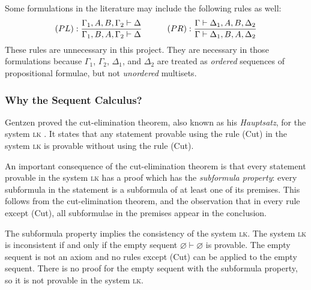 \begin{remark}
    Some formulations in the literature may include the following rules as well:
    {
        \derivationfont
        \[
            (PL): \frac{\Gamma_1, A, B, \Gamma_2 \vdash \Delta}{\Gamma_1, B, A, \Gamma_2 \vdash \Delta} \quad\quad\quad (PR): \frac{\Gamma \vdash \Delta_1, A, B, \Delta_2}{\Gamma \vdash \Delta_1, B, A, \Delta_2}
        \]
    }%
    These rules are unnecessary in this project. They are necessary in those formulations because $\Gamma_1$, $\Gamma_2$, $\Delta_1$, and $\Delta_2$ are treated as \textit{ordered} sequences of propositional formulae, but not \textit{unordered} multisets.
\end{remark}

\subsubsection{Why the Sequent Calculus?}
Gentzen proved the cut-elimination theorem, also known as his \textit{Hauptsatz}, for the system \textsc{lk} \cite{gentzen:1969}. It states that any statement provable using the rule (\textsf{Cut}) in the system \textsc{lk} is provable without using the rule (\textsf{Cut}).

An important consequence of the cut-elimination theorem is that every statement provable in the system \textsc{lk} has a proof which has the \textit{subformula property}: every subformula in the statement is a subformula of at least one of its premises. This follows from the cut-elimination theorem, and the observation that in every rule except (\textsf{Cut}), all subformulae in the premises appear in the conclusion.

The subformula property implies the consistency of the system \textsc{lk}. The system \textsc{lk} is inconsistent if and only if the empty sequent $\varnothing \vdash \varnothing$ is provable. The empty sequent is not an axiom and no rules except (\textsf{Cut}) can be applied to the empty sequent. There is no proof for the empty sequent with the subformula property, so it is not provable in the system \textsc{lk}.
